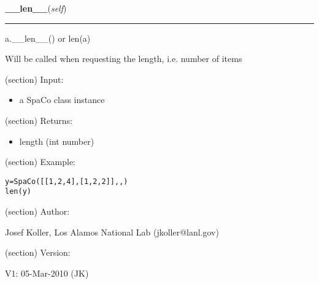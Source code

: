     \vspace{0.5ex}

\hspace{.8\funcindent}\begin{boxedminipage}{\funcwidth}

    \raggedright \textbf{\_\_len\_\_}(\textit{self})

    \vspace{-1.5ex}

    \rule{\textwidth}{0.5\fboxrule}
\setlength{\parskip}{2ex}
    a.\_\_len\_\_() or len(a)

    Will be called when requesting the length, i.e. number of items

    (section) Input:

      \begin{itemize}
      \setlength{\parskip}{0.6ex}
        \item a SpaCo class instance

      \end{itemize}

    (section) Returns:

      \begin{itemize}
      \setlength{\parskip}{0.6ex}
        \item length (int number)

      \end{itemize}

    (section) Example:

\begin{alltt}
\pysrcprompt{{\textgreater}{\textgreater}{\textgreater} }y = SpaCo([[1,2,4],[1,2,2]], , )
\pysrcprompt{{\textgreater}{\textgreater}{\textgreater} }len(y)
\end{alltt}
    (section) Author:

      Josef Koller, Los Alamos National Lab (jkoller@lanl.gov)

    (section) Version:

      V1: 05-Mar-2010 (JK)

\setlength{\parskip}{1ex}
    \end{boxedminipage}

    \label{spacepy:spacetime:SpaCo:convert}

    \vspace{0.5ex}

